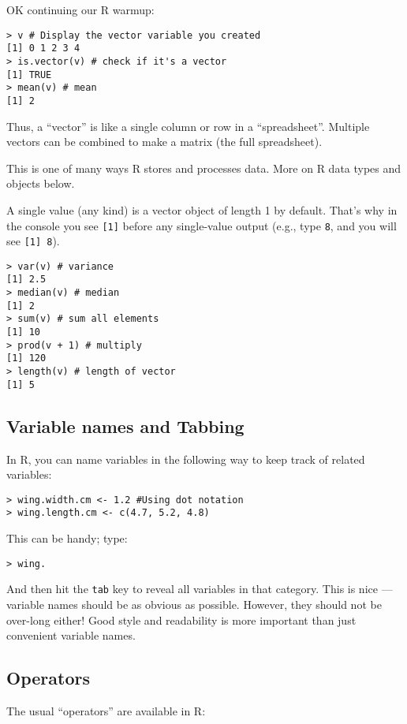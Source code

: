OK continuing our R warmup:
\begin{lstlisting}
> v # Display the vector variable you created
[1] 0 1 2 3 4
> is.vector(v) # check if it's a vector
[1] TRUE
> mean(v) # mean
[1] 2
\end{lstlisting}

\begin{tipbox}
Thus, a ``vector'' is like a single column or row in a ``spreadsheet''. Multiple vectors can be combined to make a matrix (the full spreadsheet).  
\end{tipbox}

This is one of many ways R stores and processes data. More on R data 
types and objects below.  

A single value (any kind) is a vector object of length 1 by default. 
That's why in the console you see {\tt [1]} before any single-value 
output (e.g., type {\tt 8}, and you will see {\tt [1] 8}).

\begin{lstlisting}
> var(v) # variance
[1] 2.5
> median(v) # median
[1] 2
> sum(v) # sum all elements
[1] 10
> prod(v + 1) # multiply
[1] 120
> length(v) # length of vector
[1] 5
\end{lstlisting}

\subsection{Variable names and Tabbing}

In R, you can name variables in the following way to keep track of 
related variables:
\begin{lstlisting}
> wing.width.cm <- 1.2 #Using dot notation 
> wing.length.cm <- c(4.7, 5.2, 4.8)
\end{lstlisting}

This can be handy; type:
\begin{lstlisting}
> wing.
\end{lstlisting}

And then hit the {\tt tab} key to reveal all variables in that 
category. This is nice --- variable names should be as obvious as 
possible. However, they should not be over-long either! Good style and 
readability is more important than just convenient variable names. 

\subsection{Operators}
The usual ``operators'' are available in R:

